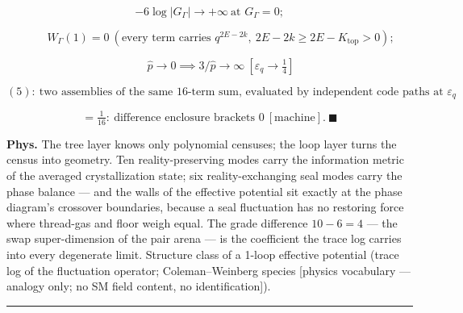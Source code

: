 \begin{theorem}
\[
-6\log|G_\Gamma|\to+\infty\ \text{at }G_\Gamma=0;
\]

\[
\qquad W_\Gamma(1)=0\ (\text{every term carries }q^{2E-2k},\ 2E-2k\ge2E-K_{\mathrm{top}}>0);
\]

\[
\qquad \hat p\to0\implies3/\hat p\to\infty\ [\varepsilon_q\to\tfrac14]
\]

\[
(5):\ \text{two assemblies of the same }16\text{-term sum, evaluated by independent code paths at }\varepsilon_q
\]

\[
= \tfrac1{16}:\ \text{difference enclosure brackets }0\ [\text{machine}].\ \blacksquare
\]

\textbf{Phys.} The tree layer knows only polynomial censuses; the loop layer turns the census into geometry. Ten reality-preserving modes carry the information metric of the averaged crystallization state; six reality-exchanging seal modes carry the phase balance — and the walls of the effective potential sit exactly at the phase diagram's crossover boundaries, because a seal fluctuation has no restoring force where thread-gas and floor weigh equal. The grade difference $10-6=4$ — the swap super-dimension of the pair arena — is the coefficient the trace log carries into every degenerate limit. Structure class of a 1-loop effective potential (trace log of the fluctuation operator; Coleman–Weinberg species [physics vocabulary — analogy only; no SM field content, no identification]).

\vspace{2pt}\noindent\rule{\textwidth}{0.4pt}\vspace{2pt}

\end{theorem}

